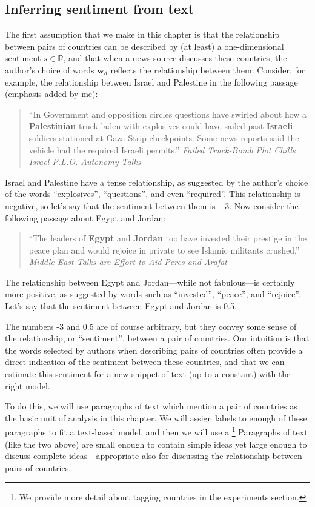 \subsection{Inferring sentiment from text}
\label{sec:text_regression}
The first assumption that we make in this chapter is that the
relationship between pairs of countries can be described by (at least) a
one-dimensional sentiment $s \in \mathbb{R}$, and that when a news
source discusses these countries, the author's choice of words $\bm
w_d$ reflects the relationship between them.
Consider, for example, the relationship between Israel and Palestine
in the following passage (emphasis added by me):
\begin{quote} ``In Government and opposition circles
  questions have swirled about how a \textbf{Palestinian} truck laden with
  explosives could have sailed past \textbf{Israeli} soldiers stationed at
  Gaza Strip checkpoints.  Some news reports said the vehicle had
  the required Israeli permits.'' \emph{Failed Truck-Bomb Plot Chills
    Israel-P.L.O. Autonomy Talks} \citep{nyt_haberman:1995}
\end{quote}
Israel and Palestine have a tense relationship, as suggested by the
author's choice of the words ``explosives'', ``questions'', and even
``required''.  This relationship is negative, so let's say that the
sentiment between them is $-3$. Now consider the
following passage about Egypt and Jordan:
\begin{quote} ``The leaders of \textbf{Egypt} and
  \textbf{Jordan} too have invested their prestige in the peace plan
  and would rejoice in private to see Islamic militants crushed.''
  \emph{Middle East Talks are Effort to Aid Peres and Arafat}
  \citep{nyt_jehl:1996}
\end{quote}
The relationship between Egypt and Jordan---while not fabulous---is
certainly more positive, as suggested by words such as ``invested'',
``peace'', and ``rejoice''.  Let's say that the sentiment between
Egypt and Jordan is 0.5.

The numbers -3 and 0.5 are of course arbitrary, but they convey some
sense of the relationship, or ``sentiment'', between a pair of
countries.  Our intuition is that the words selected by authors when
describing pairs of countries often provide a direct indication of the
sentiment between these countries, and that we can estimate this
sentiment for a new snippet of text (up to a constant) with the right
model.

To do this, we will use paragraphs of text which mention a pair of
countries as the basic unit of analysis in this chapter.  We will
assign labels to enough of these paragraphs to fit a text-based
model, and then we will use a \footnote{We provide more detail about tagging countries in the
  experiments section.}  Paragraphs of text (like the two above) are
small enough to contain simple ideas yet large enough to discuss
complete ideas---appropriate also for discussing the relationship
between pairs of countries.

